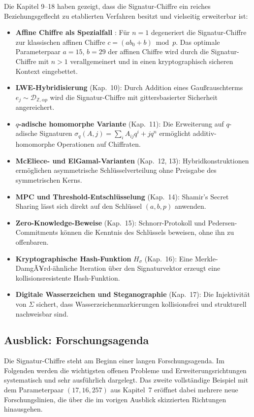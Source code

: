 ﻿\documentclass[a4paper,12pt]{scrreprt}
\theoremstyle{definition}
\begin{document}
Die Kapitel 9--18 haben gezeigt, dass die Signatur-Chiffre ein reiches Beziehungsgeflecht zu etablierten Verfahren besitzt und vielseitig erweiterbar ist:

\begin{itemize}
  \item \textbf{Affine Chiffre als Spezialfall} \cite{Epp26c}: Für $n=1$ degeneriert die Signatur-Chiffre zur klassischen affinen Chiffre $c = (ab_0 + b) \bmod p$. Das optimale Parameterpaar $a=15$, $b=29$ der affinen Chiffre \cite{Epp26c} wird durch die Signatur-Chiffre mit $n>1$ verallgemeinert und in einen kryptographisch sicheren Kontext eingebettet.
  \item \textbf{LWE-Hybridisierung} (Kap.~10): Durch Addition eines Gaußrauschterms $e_j \sim \mathcal{D}_{\mathbb{Z},\alpha p}$ wird die Signatur-Chiffre mit gittersbasierter Sicherheit \cite{Reg05} angereichert.
  \item \textbf{$q$-adische homomorphe Variante} (Kap.~11): Die Erweiterung auf $q$-adische Signaturen $\sigma_q(A,j) = \sum_i A_{ij} q^i + j q^n$ ermöglicht additiv-homomorphe Operationen auf Chiffraten.
  \item \textbf{McEliece- und ElGamal-Varianten} (Kap.~12, 13): Hybridkonstruktionen ermöglichen asymmetrische Schlüsselverteilung ohne Preisgabe des symmetrischen Kerns.
  \item \textbf{MPC und Threshold-Entschlüsselung} (Kap.~14): Shamir's Secret Sharing \cite{Sha79} lässt sich direkt auf den Schlüssel $(a,b,p)$ anwenden.
  \item \textbf{Zero-Knowledge-Beweise} (Kap.~15): Schnorr-Protokoll und Pedersen-Commitments können die Kenntnis des Schlüssels beweisen, ohne ihn zu offenbaren.
  \item \textbf{Kryptographische Hash-Funktion} $H_\sigma$ (Kap.~16): Eine Merkle-DamgÃ¥rd-ähnliche Iteration über den Signaturvektor erzeugt eine kollisionsresistente Hash-Funktion.
  \item \textbf{Digitale Wasserzeichen und Steganographie} (Kap.~17): Die Injektivität von $\Sigma$ sichert, dass Wasserzeichenmarkierungen kollisionsfrei und strukturell nachweisbar sind.
\end{itemize}

\subsection{Ausblick: Forschungsagenda}

Die Signatur-Chiffre steht am Beginn einer langen Forschungsagenda. Im Folgenden werden die wichtigsten offenen Probleme und Erweiterungsrichtungen systematisch und sehr ausführlich dargelegt. Das zweite vollständige Beispiel mit dem Parameterpaar $(17, 16, 257)$ aus Kapitel~7 eröffnet dabei mehrere neue Forschungslinien, die über die im vorigen Ausblick skizzierten Richtungen hinausgehen.
\end{document}
